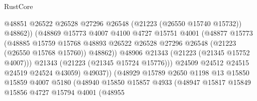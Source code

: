 \begin{lexlean}{RustCore}
\begin{coremodule}
                                        @48851
                                        @26522
                                        @26528
                                        @27296
                                        @26548
                                        (@21223 (@26550 @15740 @15732))
                                        @48862))
                                    (@48869
                                      @15773
                                      @4007
                                      @4100
                                      @4727
                                      @15751
                                      @4001
                                      (@48877
                                        @15773
                                        (@48885
                                          @15759
                                          @15768
                                          @48893
                                          @26522
                                          @26528
                                          @27296
                                          @26548
                                          (@21223 (@26550 @15768 @15760))
                                          @48862))
                                      @48906
                                      @21343
                                      (@21223 (@21345 @15752 @4007)))
                                    @21343
                                    (@21223 (@21345 @15724 @15776)))
                                  @24509
                                  @24512
                                  @24515
                                  @24519
                                  @24524
                                  @43059)
                                @49037))
                            (@48929
                              @15789
                              @2650
                              @1198
                              @13
                              @15850
                              @15859
                              @4007
                              @5180
                              (@48940
                                @15850
                                @15857
                                @4933
                                (@48947
                                  @15817
                                  @15849
                                  @15856
                                  @4727
                                  @15794
                                  @4001
                                  (@48955

\end{coremodule}
\end{lexlean}
